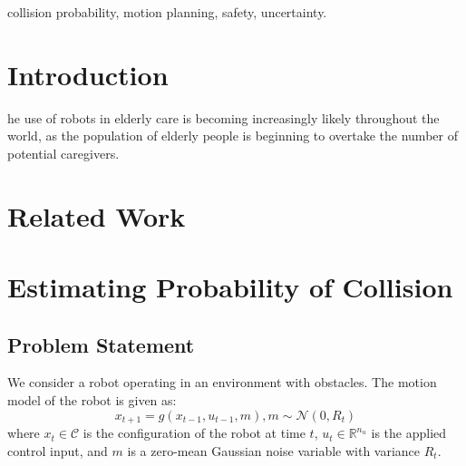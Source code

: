 \documentclass[journal]{IEEEtran}
\begin{document}
\begin{IEEEkeywords}
 collision probability, motion planning, safety, uncertainty.
\end{IEEEkeywords}

%
\IEEEpeerreviewmaketitle


\section{Introduction}
% 
% 
% 
% 
he use of robots in elderly care is becoming increasingly likely throughout the world, as the population of elderly people is beginning to overtake the number of potential caregivers. 

\section{Related Work}

\section{Estimating Probability of Collision}
\subsection{Problem Statement}
We consider a robot operating in an environment with obstacles.%
The motion model of the robot is given as:
$$x_{t+1} = g(x_{t-1}, u_{t-1}, m), m \sim \mathcal{N}(0,R_t)$$
where $x_t \in \mathcal{C}$ is the configuration of the robot at time $t$, $u_t \in\mathbb{R}^{n_u}$ is the applied control input, and $m$ is a zero-mean Gaussian noise variable with variance $R_t$.
\end{document}
